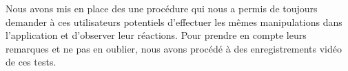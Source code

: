 \documentclass[a4paper, 11px]{article}
\begin{document}
Nous avons mis en place des une procédure qui nous a permis de toujours demander à ces utilisateurs potentiels d'effectuer les mêmes manipulations dans l'application et d'observer leur réactions. Pour prendre en compte leurs remarques et ne pas en oublier, nous avons procédé à des enregistrements vidéo de ces tests.
\end{document}
